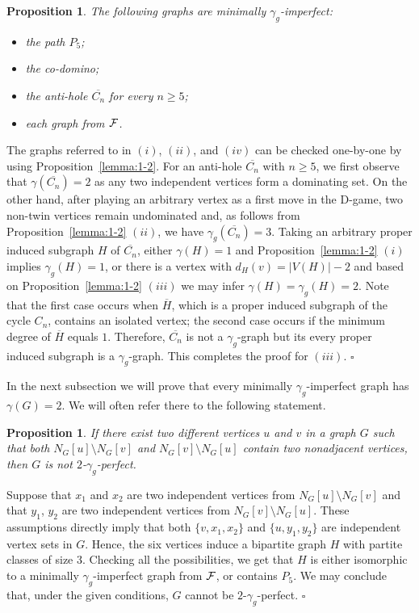 \documentclass[12pt]{article}
\newtheorem{proposition}[theorem]{Proposition}
\newcommand{\proof}{\noindent{\bf Proof.\ }}
\newcommand{\qed}{\hfill $\square$ \bigskip}
\newcommand{\cF}{{\cal F}}
\begin{document}
\begin{proposition}
	\label{prop:min-imperfect}
	The following graphs are minimally $\gamma_g$-imperfect:
\begin{itemize}
	\item[$(i)$] the path $P_5$;
	\item[$(ii)$] the co-domino; 
	\item[$(iii)$] the anti-hole $\overline{C_n}$ for every $n \ge 5$;
	\item[$(iv)$] each graph from $\cF$. 
	\end{itemize}
\end{proposition}
\proof The graphs referred to in $(i)$, $(ii)$, and $(iv)$ can be checked one-by-one by using Proposition~\ref{lemma:1-2}. For an anti-hole  $\overline{C_n}$ with $n\ge 5$, we first observe that $\gamma(\overline{C_n})=2$ as any two independent vertices form a dominating set. On the other hand, after playing an arbitrary vertex as a first move in the D-game, two non-twin vertices remain undominated and, as follows from  Proposition~\ref{lemma:1-2} $(ii)$, we have  $\gamma_g(\overline{C_n})=3$. Taking an arbitrary proper induced subgraph $H$ of $\overline{C_n}$, either $\gamma(H)=1$ and Proposition~\ref{lemma:1-2} $(i)$ implies $\gamma_g(H)=1$, or there is a vertex with $d_H(v)=|V(H)|-2$ and based on  Proposition~\ref{lemma:1-2} $(iii)$ we may infer $\gamma(H)=\gamma_g(H)=2$. Note that the first case occurs when $\overline{H}$, which is a proper induced subgraph of the cycle $C_n$, contains an isolated vertex; the second case occurs if the minimum degree of $\overline{H}$ equals $1$. Therefore, $\overline{C_n}$ is not a $\gamma_g$-graph but its every proper induced subgraph is a $\gamma_g$-graph. This completes the proof for $(iii)$.
\qed

In the next subsection we will prove that every minimally $\gamma_g$-imperfect graph has $\gamma(G)=2$. We will often refer there to the following statement.
\begin{proposition}
	\label{prop:minimperfect}
If there exist two different vertices $u$ and $v$ in a graph $G$ such that both $N_G\left[u \right] \setminus N_G\left[v \right]$ and $N_G\left[v \right] \setminus N_G\left[u \right]$ contain two nonadjacent vertices, then $G$ is not $2$-$\gamma_g$-perfect.
\end{proposition}
\proof  Suppose  that  $x_1$ and $x_2$ are two independent vertices from $N_G\left[u \right] \setminus N_G\left[v \right]$ and that $y_1$, $y_2$ are two independent vertices from $N_G\left[v \right] \setminus N_G\left[u \right]$. These assumptions directly imply that both $\{v,x_1,x_2\}$ and  $\{u,y_1,y_2\}$ are independent vertex sets in $G$. Hence, the six vertices induce a bipartite graph $H$ with partite classes of size $3$. Checking all the possibilities, we get that $H$ is either isomorphic to a minimally $\gamma_g$-imperfect graph from $\cF$, or contains $P_5$. We may conclude that, under the given conditions, $G$ cannot be $2$-$\gamma_g$-perfect.
\qed
\end{document}
